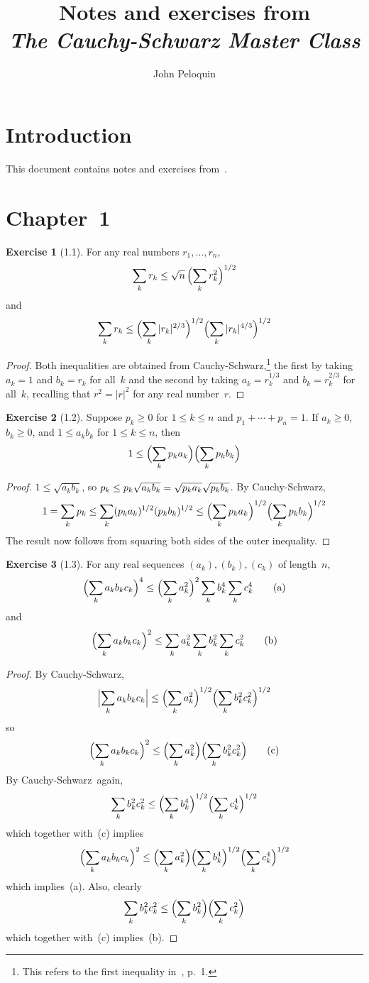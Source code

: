 \documentclass[letterpaper,12pt]{article}
\title{Notes and exercises from\\\textit{The Cauchy-Schwarz Master Class}}
\author{John Peloquin}
\date{}
\newcommand{\CS}{Cauchy-Schwarz}
\newcommand{\Biglp}[1]{\Bigl({#1}\Bigr)}
\newcommand{\abs}[1]{|{#1}|}
\newcommand{\Biglabs}[1]{\Bigl|{#1}\Bigr|}
\theoremstyle{definition}
\newtheorem*{exer}{Exercise}
\theoremstyle{remark}
\begin{document}
\maketitle

\section*{Introduction}
This document contains notes and exercises from~\cite{steele}.

\section*{Chapter~1}
\begin{exer}[1.1]
For any real numbers \(r_1,\ldots,r_n\),
\[\sum_k r_k\le\sqrt{n}\,\Biglp{\sum_k r_k^2}^{1/2}\]
and
\[\sum_k r_k\le\Biglp{\sum_k\abs{r_k}^{2/3}}^{1/2}\Biglp{\sum_k\abs{r_k}^{4/3}}^{1/2}\]
\end{exer}
\begin{proof}
Both inequalities are obtained from \CS,\footnote{This refers to the first inequality in~\cite{steele}, p.~1.} the first by taking \(a_k=1\) and \(b_k=r_k\) for all~\(k\) and the second by taking \(a_k=r_k^{1/3}\) and \(b_k=r_k^{2/3}\) for all~\(k\), recalling that \(r^2=\abs{r}^2\) for any real number~\(r\).
\end{proof}

\begin{exer}[1.2]
Suppose \(p_k\ge 0\) for \(1\le k\le n\) and \(p_1+\cdots+p_n=1\). If \(a_k\ge 0\), \(b_k\ge 0\), and \(1\le a_kb_k\) for \(1\le k\le n\), then
\[1\le\Biglp{\sum_k p_ka_k}\Biglp{\sum_k p_kb_k}\]
\end{exer}
\begin{proof}
\(1\le\sqrt{a_kb_k}\), so \(p_k\le p_k\sqrt{a_kb_k}=\sqrt{p_ka_k\vphantom{b_k}}\sqrt{p_kb_k}\). By \CS,
\[1=\sum_k p_k\le\sum_k(p_ka_k)^{1/2}(p_kb_k)^{1/2}\le\Biglp{\sum_k p_ka_k}^{1/2}\Biglp{\sum_k p_kb_k}^{1/2}\]
The result now follows from squaring both sides of the outer inequality.
\end{proof}

\begin{exer}[1.3]
For any real sequences \((a_k),(b_k),(c_k)\) of length~\(n\),
\[\Biglp{\sum_k a_kb_kc_k}^4\le\Biglp{\sum_k a_k^2}^2\sum_k b_k^4\sum_k c_k^4\tag{a}\]
and
\[\Biglp{\sum_k a_kb_kc_k}^2\le\sum_k a_k^2\sum_k b_k^2\sum_k c_k^2\tag{b}\]
\end{exer}
\begin{proof}
By \CS,
\[\Biglabs{\sum_k a_kb_kc_k}\le\Biglp{\sum_k a_k^2}^{1/2}\Biglp{\sum_k b_k^2c_k^2}^{1/2}\]
so
\[\Biglp{\sum_k a_kb_kc_k}^2\le\Biglp{\sum_k a_k^2}\Biglp{\sum_k b_k^2c_k^2}\tag{c}\]
By \CS\ again,
\[\sum_k b_k^2c_k^2\le\Biglp{\sum_k b_k^4}^{1/2}\Biglp{\sum_k c_k^4}^{1/2}\]
which together with~(c) implies
\[\Biglp{\sum_k a_kb_kc_k}^2\le\Biglp{\sum_k a_k^2}\Biglp{\sum_k b_k^4}^{1/2}\Biglp{\sum_k c_k^4}^{1/2}\]
which implies~(a). Also, clearly
\[\sum_k b_k^2c_k^2\le\Biglp{\sum_k b_k^2}\Biglp{\sum_k c_k^2}\]
which together with~(c) implies~(b).
\end{proof}
\end{document}
